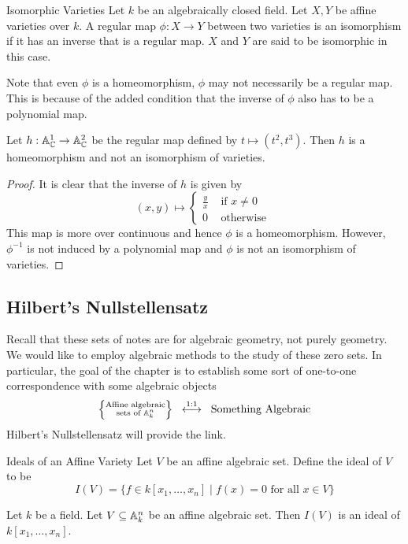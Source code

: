 \documentclass[a4paper]{article}
\begin{document}
\begin{defn}{Isomorphic Varieties}{} Let $k$ be an algebraically closed field. Let $X,Y$ be affine varieties over $k$. A regular map $\phi:X\to Y$ between two varieties is an isomorphism if it has an inverse that is a regular map. $X$ and $Y$ are said to be isomorphic in this case. 
\end{defn}

Note that even $\phi$ is a homeomorphism, $\phi$ may not necessarily be a regular map. This is because of the added condition that the inverse of $\phi$ also has to be a polynomial map. 

\begin{eg}{}{} Let $h:\mathbb{A}_{\mathbb{C}}^1\to\mathbb{A}_{\mathbb{C}}^2$ be the regular map defined by $t\mapsto(t^2,t^3)$. Then $h$ is a homeomorphism and not an isomorphism of varieties. \tcbline
\begin{proof}
It is clear that the inverse of $h$ is given by $$(x,y)\mapsto\begin{cases}
\frac{y}{x} & \text{ if }x\neq 0\\
0 & \text{ otherwise }
\end{cases}$$ This map is more over continuous and hence $\phi$ is a homeomorphism. However, $\phi^{-1}$ is not induced by a polynomial map and $\phi$ is not an isomorphism of varieties. 
\end{proof}
\end{eg}

\subsection{Hilbert's Nullstellensatz}
Recall that these sets of notes are for algebraic geometry, not purely geometry. We would like to employ algebraic methods to the study of these zero sets. In particular, the goal of the chapter is to establish some sort of one-to-one correspondence with some algebraic objects $$\left\{\substack{\text{Affine algebraic}\\\text{sets of }\mathbb{A}_k^n}\right\}\;\;\overset{1:1}{\longleftrightarrow}\;\;\text{Something Algebraic}$$ Hilbert's Nullstellensatz will provide the link. 

\begin{defn}{Ideals of an Affine Variety}{} Let $V$ be an affine algebraic set. Define the ideal of $V$ to be $$I(V)=\{f\in k[x_1,\dots,x_n]\;|\;f(x)=0\text{ for all }x\in V\}$$ 
\end{defn}

\begin{lmm}{}{} Let $k$ be a field. Let $V\subseteq\mathbb{A}_k^n$ be an affine algebraic set. Then $I(V)$ is an ideal of $k[x_1,\dots,x_n]$. 
\end{lmm}
\end{document}
